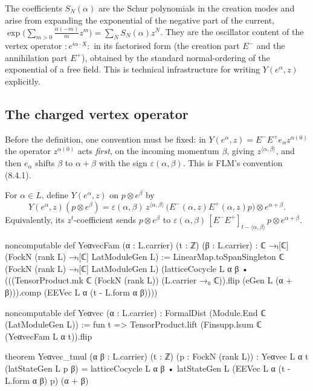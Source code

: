 \begin{physics}
The coefficients $S_N(\alpha)$ are the Schur polynomials in the creation modes and arise from expanding the exponential of the negative part of the current, $\exp\bigl(\sum_{m>0}\frac{\alpha(-m)}{m}z^m\bigr)=\sum_NS_N(\alpha)z^N$. They are the oscillator content of the vertex operator $:\!e^{i\alpha\cdot X}\!:$ in its factorised form (the creation part $E^-$ and the annihilation part $E^+$), obtained by the standard normal-ordering of the exponential of a free field. This is technical infrastructure for writing $Y(e^\alpha,z)$ explicitly.
\end{physics}

\subsection{The charged vertex operator}

Before the definition, one convention must be fixed: in $Y(e^\alpha,z)=E^-E^+e_\alpha
z^{\alpha(0)}$ the operator $z^{\alpha(0)}$ acts \emph{first}, on the incoming momentum $\beta$,
giving $z^{\langle\alpha,\beta\rangle}$, and then $e_\alpha$ shifts $\beta$ to $\alpha+\beta$ with
the sign $\varepsilon(\alpha,\beta)$. This is FLM's convention (8.4.1).

\begin{definition}[$Y(e^\alpha,z)$]\label{ch03:def:Yealpha}
For $\alpha\in L$, define $Y(e^\alpha,z)$ on $p\otimes e^\beta$ by
\begin{equation}\label{ch03:eq:Yealpha}
  Y(e^\alpha,z)(p\otimes e^\beta)=\varepsilon(\alpha,\beta)\,z^{\langle\alpha,\beta\rangle}\,
  \bigl(E^-(\alpha,z)E^+(\alpha,z)p\bigr)\otimes e^{\alpha+\beta}.
\end{equation}
Equivalently, its $z^t$-coefficient sends $p\otimes e^\beta$ to
$\varepsilon(\alpha,\beta)\,[E^-E^+]_{t-\langle\alpha,\beta\rangle}\,p\otimes e^{\alpha+\beta}$.
\end{definition}
\begin{leancode}
noncomputable def YeαvecFam (α : L.carrier) (t : ℤ) (β : L.carrier) :
    ℂ →ₗ[ℂ] (FockN (rank L) →ₗ[ℂ] LatModuleGen L) :=
  LinearMap.toSpanSingleton ℂ (FockN (rank L) →ₗ[ℂ] LatModuleGen L)
    (latticeCocycle L α β •
      (((TensorProduct.mk ℂ (FockN (rank L)) (L.carrier →₀ ℂ)).flip (eGen L (α + β))).comp
        (EEVec L α (t - L.form α β))))

noncomputable def Yeαvec (α : L.carrier) : FormalDist (Module.End ℂ (LatModuleGen L)) :=
  fun t => TensorProduct.lift (Finsupp.lsum ℂ (YeαvecFam L α t)).flip

theorem Yeαvec_tmul (α β : L.carrier) (t : ℤ) (p : FockN (rank L)) :
    Yeαvec L α t (latStateGen L p β)
      = latticeCocycle L α β • latStateGen L (EEVec L α (t - L.form α β) p) (α + β)
\end{leancode}

